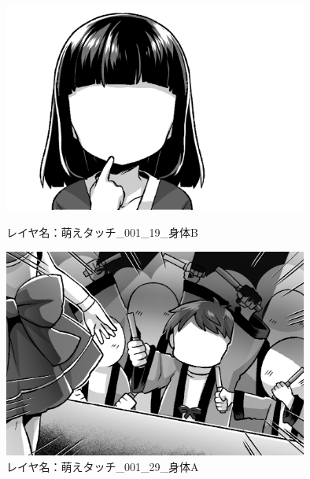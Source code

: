 \documentclass[onecolumn]{ujarticle}     %
\begin{document}
	\begin{figure}[t!]
		\hspace{40mm}
		\centering
		\includegraphics[width=100mm]{学術利用4コマ_萌えタッチ_001_19_身体B-crop_1-2.png}
		\caption{レイヤ名：萌えタッチ\_001\_19\_身体B}
		
		\hspace{40mm}
		\centering
		\includegraphics[width=100mm]{学術利用4コマ_萌えタッチ_001_29_身体A-crop_1-4.png}
		\caption{レイヤ名：萌えタッチ\_001\_29\_身体A}
	\end{figure}
\end{document}
